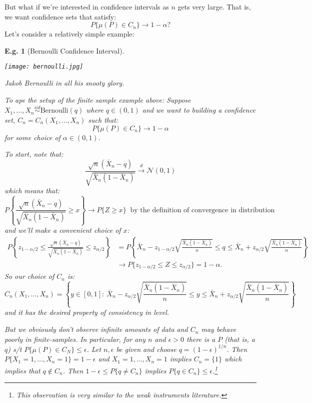 \documentclass{tufte-book}
\theoremstyle{mytheoremstyle}
\theoremstyle{mylemstyle}
\theoremstyle{mydefstyle}
\newtheorem*{ex}{E.g.}
\begin{document}
But what if we're interested in confidence intervals as \(n\) gets very large. That is, we want confidence sets that satisfy:
	\[P\{\mu(P) \in C_n\} \rightarrow 1-\alpha \text{?}\]
Let's consider a relatively simple example:
\begin{ex}[Bernoulli Confidence Interval] \begin{marginfigure}
	\texttt{[image: bernoulli.jpg]}
	\caption{Jakob Bernoulli in all his snooty glory.}
\end{marginfigure}
To ape the setup of the finite sample example above: Suppose \(X_1, \dots, X_n \overset{iid}{\sim} \text{Bernoulli}(q)\) where \(q \in (0, 1)\) and we want to building a confidence set, \(C_n = C_n (X_1, \dots, X_n)\) such that:
	\[P\{\mu(P) \in C_n\} \rightarrow 1-\alpha\]
for some choice of \(\alpha \in (0, 1)\). 

To start, note that:
	\[\frac{\sqrt{n}(\bar{X}_n - q)}{\sqrt{\bar{X}_n(1-\bar{X}_n)}} \overset{d}{\rightarrow} \mathcal{N}(0, 1)\]
which means that:
	\[P\left\{\frac{\sqrt{n}(\bar{X}_n - q)}{\sqrt{\bar{X}_n(1-\bar{X}_n)}} \ge x\right\} \rightarrow P\{Z \ge x\}\ \text{ by the definition of convergence in distribution} \]
and we'll make a convenient choice of \(x\):
	\begin{align*}
		P\left\{z_{1- \alpha/2} \le \frac{\sqrt{n}(\bar{X}_n - q)}{\sqrt{\bar{X}_n(1-\bar{X}_n)}} \le z_{\alpha/2} \right\} & = P\left\{\bar{X}_n - z_{1- \alpha/2}\sqrt{\frac{\bar{X}_n(1-\bar{X}_n)}{n}} \le q \le \bar{X}_n + z_{\alpha/2}\sqrt{\frac{\bar{X}_n(1-\bar{X}_n)}{n}} \right\} \\
		& \rightarrow P\{z_{1-\alpha/2} \le Z \le z_{\alpha/2}\} = 1 - \alpha \text{.}
	\end{align*}
So our choice of \(C_n\) is:
	\[C_n(X_1, \dots, X_n) = \left\{y \in [0, 1]:\ \bar{X}_n - z_{\alpha/2}\sqrt{\frac{\bar{X}_n(1-\bar{X}_n)}{n}} \le y \le \bar{X}_n + z_{\alpha/2}\sqrt{\frac{\bar{X}_n(1-\bar{X}_n)}{n}} \right\} \]
and it has the desired property of consistency in level.

But we obviously don't observe infinite amounts of data and \(C_n\) may behave poorly in finite-samples. In particular, for any \(n\) and \(\epsilon > 0\) there is a \(P\) (that is, a \(q\)) s/t \(P\{\mu(P) \in C_N\} \le \epsilon\). Let \(n, \epsilon\) be given and choose \(q = (1-\epsilon)^{1/n}\). Then \(P\{X_1 = 1, \dots, X_n = 1\} = 1-\epsilon\) and \(X_1 = 1, \dots, X_n = 1\) implies \(C_n = \{1\}\) which implies that \(q \not \in C_n\). Then \(1- \epsilon \le P\{q \ne C_n\}\) implies \(P\{q \in C_n\} \le \epsilon\).\footnote{This observation is very similar to the weak instruments literature.} 

\end{ex}
\end{document}
